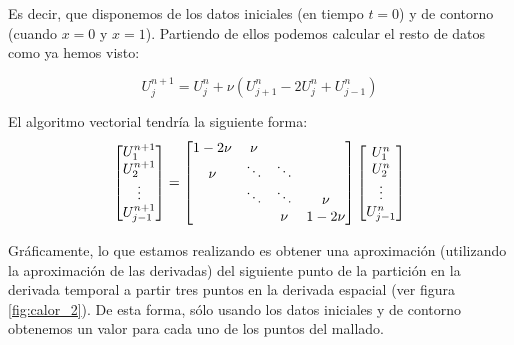 Es decir, que disponemos de los datos iniciales (en tiempo $t=0$) y de contorno (cuando $x=0$ y $x=1$). Partiendo de ellos podemos calcular el resto de datos como ya hemos visto:

$$U_j^{n+1} = U_j^n+\nu\left(U_{j+1}^n - 2 U_j^n + U_{j-1}^n\right)$$

El algoritmo vectorial tendría la siguiente forma:
\begin{equation*}
	\begin{array}{l l l}
		\begin{bmatrix}
			U_1^{n+1}\\
			U_2^{n+1}\\
			\vdots\\
			U_{j-1}^{n+1}\\
		\end{bmatrix}
		=
		\begin{bmatrix}
			1-2\nu & \nu       &        & \\
			\nu    & \ddots    & \ddots & \\
			          & \ddots & \ddots & \nu\\
			          &        & \nu    & 1-2\nu\\
		\end{bmatrix}
		\begin{bmatrix}
			U_1^{n}\\
			U_2^{n}\\
			\vdots\\
			U_{j-1}^{n}\\
		\end{bmatrix}
	\end{array}
\end{equation*}

Gráficamente, lo que estamos realizando es obtener una aproximación (utilizando la aproximación de las derivadas) del siguiente punto de la partición en la derivada temporal a partir tres puntos en la derivada espacial (ver figura \ref{fig:calor_2}). De esta forma, sólo usando los datos iniciales y de contorno obtenemos un valor para cada uno de los puntos del mallado.

